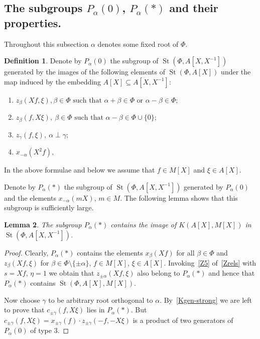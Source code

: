 \documentclass[oneside, 8pt]{amsart}
\newtheorem{lemma}{Lemma}
\theoremstyle{remark}
\theoremstyle{definition}
\newtheorem{df}[lemma]{Definition} \Crefname{df}{Definition}{Definitions}
\DeclareMathOperator{\St}{St}
\numberwithin{equation}{section}
\begin{document}
\subsection{The subgroups $P_\alpha(0)$, $P_\alpha(*)$ and their properties.} Throughout this subsection $\alpha$ denotes some fixed root of $\Phi$.
\begin{df} \label{defP0}
Denote by $P_\alpha(0)$ the subgroup of $\St(\Phi, A[X, X^{-1}])$ generated by the images of the following elements of $\St(\Phi, A[X])$ under the
 map induced by the embedding $A[X] \subseteq A[X, X^{-1}]$:
\begin{enumerate}
 \item $z_{\beta}(Xf, \xi), \beta \in \Phi \text{ such that }\alpha + \beta \in \Phi\text{ or } \alpha - \beta \in \Phi;$
 \item $z_{\beta}(f, X\xi),\ \beta \in \Phi \text{ such that }\alpha - \beta \in \Phi \cup \{0\};$
 \item $z_{\gamma}(f, \xi),\ \alpha \perp \gamma;$
 \item $x_{-\alpha}(X^2f),$
\end{enumerate}
In the above formulae and below we assume that $f \in M[X]$ and $\xi \in A[X]$. \end{df}

Denote by $P_\alpha(*)$ the subgroup of $\St(\Phi, A[X, X^{-1}])$ generated by $P_\alpha(0)$ and the elements $x_{-\alpha}(mX)$, $m \in M$. The following lemma shows that this subgroup is sufficiently large.
\begin{lemma} \label{Pstar-large} The subgroup $P_\alpha(*)$ contains the image of $K(A[X], M[X])$ in $\St(\Phi, A[X, X^{-1}])$. \end{lemma}
\begin{proof}
Clearly, $P_\alpha(*)$ contains the elements $x_\beta(Xf)$ for all $\beta \in \Phi$ and $z_\beta(Xf, \xi)$ for $\beta \in \Phi \setminus \{\pm \alpha\}$, $f \in M[X]$, $\xi\in A[X]$. Invoking~\eqref{Z5} of~\cref{Zrels} with $s = Xf$, $\eta = 1$ we obtain that $z_{\pm\alpha}(Xf, \xi)$ also belong to $P_{\alpha}(*)$ and hence that $P_\alpha(*)$ contains $\St(\Phi, A[X], M[X])$.

Now choose $\gamma$ to be arbitrary root orthogonal to $\alpha$. By~\cref{Kgen-strong} we are left to prove that $c_{\pm \gamma}(f, X\xi)$ lies in $P_\alpha(*)$. 
But $c_{\pm \gamma}(f, X\xi) = x_{\pm \gamma}(f) \cdot z_{\pm \gamma}(-f, -X\xi)$ is a product of two generators of $P_\alpha(0)$ of type 3.
\end{proof}
   
\end{document}
